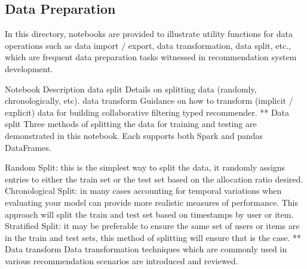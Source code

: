 \subsection{Data Preparation}

In this directory, notebooks are provided to illustrate utility functions for data operations such as data import / export, data transformation, data split, etc., which are frequent data preparation tasks witnessed in recommendation system development.

Notebook	Description
data split	Details on splitting data (randomly, chronologically, etc).
data transform	Guidance on how to transform (implicit / explicit) data for building collaborative filtering typed recommender.
** Data split Three methods of splitting the data for training and testing are demonstrated in this notebook. Each supports both Spark and pandas DataFrames.

Random Split: this is the simplest way to split the data, it randomly assigns entries to either the train set or the test set based on the allocation ratio desired.
Chronological Split: in many cases accounting for temporal variations when evaluating your model can provide more realistic measures of performance. This approach will split the train and test set based on timestamps by user or item.
Stratified Split: it may be preferable to ensure the same set of users or items are in the train and test sets, this method of splitting will ensure that is the case.
** Data transform Data transformation techniques which are commonly used in various recommendation scenarios are introduced and reviewed.
